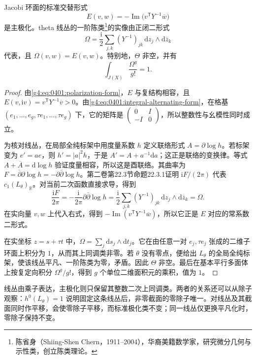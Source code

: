 \begin{theorem}
	\label{g4:thm:0404:theta-polarization}
	Jacobi 环面的标准交替形式
	\[
		E(v,w)=-\operatorname{Im}\bigl(v^{\mathsf T}Y^{-1}\overline w\bigr)
	\]
	是主极化。theta 线丛的一阶陈类\footnote{陈省身（Shiing-Shen Chern，1911--2004），华裔美籍数学家，研究微分几何与示性类，创立陈类理论。}的实像由正闭二形式
	\begin{equation}
		\label{g4:eq:0404:theta-curvature}
		\Omega=\frac{\mathrm{i}}2\sum_{j,k}(Y^{-1})_{jk}
		\,\mathrm{d}z_j\wedge\mathrm{d}\overline z_k
	\end{equation}
	代表，且 \(\Omega(v,w)=E(v,w)\)。特别地，\(\Theta\) 非空，并有
	\[
		\int_{J(X)}\frac{\Omega^g}{g!}=1.
	\]
\end{theorem}
\begin{proof}
	由\eqref{g4:eq:0401:polarization-form}，\(E\) 与复结构相容，且 \(E(v,\mathrm{i}v)=v^{\mathsf T}Y^{-1}\overline v>0\)。由\eqref{g4:eq:0401:integral-alternating-form}，在格基 \((e_1,\ldots,e_g,\tau e_1,\ldots,\tau e_g)\) 下，它的矩阵是 \(\left(\begin{smallmatrix}0&I\\-I&0\end{smallmatrix}\right)\)，所以整数性与幺模性同时成立。

	为核对线丛，在局部全纯标架中用度量系数 \(h\) 定义联络形式 \(A=\partial\log h\)。若标架变为 \(e'=a e\)，则 \(h'=|a|^2h\)，于是 \(A'=A+a^{-1}\mathrm{d}a\)；这正是联络的变换律。等式 \(A+\overline A=\mathrm{d}\log h\) 验证度量相容，所以这是酉联络。其曲率为 \(F=\bar\partial\partial\log h=-\partial\bar\partial\log h\)。第二卷第22.3节命题22.3.1证明 \(\mathrm{i}F/(2\pi)\) 代表 \(c_1(L_\theta)_{\mathbb R}\)。对当前二次函数直接求导，得到
	\[
		\frac{\mathrm{i}F}{2\pi}
		=-\frac{\mathrm{i}}{2\pi}\partial\bar\partial\log h
		=\frac{\mathrm{i}}2\sum_{j,k}(Y^{-1})_{jk}
		\,\mathrm{d}z_j\wedge\mathrm{d}\overline z_k=\Omega.
	\]
	在实向量 \(v,w\) 上代入右式，得到 \(-\operatorname{Im}(v^{\mathsf T}Y^{-1}\overline w)\)，所以它正是 \(E\) 对应的常系数二形式。

	在实坐标 \(z=s+\tau t\) 中，\(\Omega=\sum_j\mathrm{d}s_j\wedge\mathrm{d}t_j\)。它在由任意一对 \(e_j,\tau e_j\) 张成的二维子环面上积分为 \(1\)，从而其上同调类非零。若 \(\theta\) 没有零点，便给出 \(L_\theta\) 的全局全纯标架，使该线丛平凡、一阶陈类为零，矛盾。因此 \(\Theta\) 非空。最后在基本平行多面体上按复定向积分 \(\Omega^g/g!\)，得到 \(g\) 个单位二维面积元的乘积，值为 \(1\)。
\end{proof}

线丛由乘子表达，主极化则只保留其整数二次上同调类。两者的关系还可以从除子观察：\(h^0(L_\theta)=1\) 说明固定这条线丛后，非零截面的零除子唯一。对线丛及其截面同时作平移，会使零除子平移，而标准极化类不变；同一线丛仅更换平凡化时，零除子保持不变。

